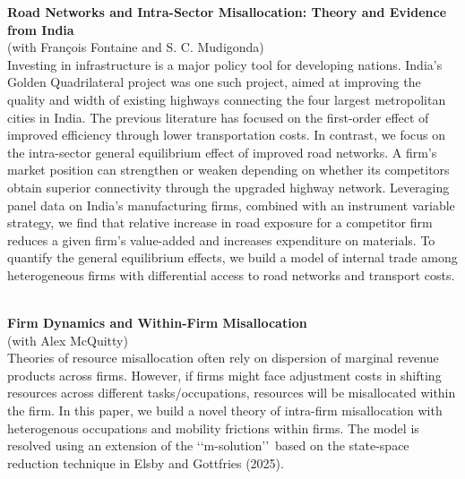 \documentclass[11pt,a4paper]{article}
\begin{document}
\textbf{Road Networks and Intra-Sector Misallocation: Theory and Evidence from India}
\vspace{0.1cm}\\
(with François Fontaine and S. C. Mudigonda)
\vspace{0.1cm}\\
Investing in infrastructure is a major policy tool for developing nations. India's Golden Quadrilateral project was one such project, aimed at improving the quality and width of existing highways connecting the four largest metropolitan cities in India. The previous literature has focused on the first-order effect of improved efficiency through lower transportation costs. In contrast, we focus on the intra-sector general equilibrium effect of improved road networks. A firm’s market position can strengthen or weaken depending on whether its competitors obtain superior connectivity through the upgraded highway network. Leveraging panel data on India's manufacturing firms, combined with an instrument variable strategy, we find that relative increase in road exposure for a competitor firm reduces a given firm's value-added and increases expenditure on materials. To quantify the general equilibrium effects, we build a model of internal trade among heterogeneous firms with differential access to road networks and transport costs.

\vspace{0.6em}\\

\textbf{Firm Dynamics and Within-Firm Misallocation}
\vspace{0.1cm}\\
(with Alex McQuitty)
\vspace{0.1cm}\\
Theories of resource misallocation often rely on dispersion of marginal revenue products across firms. However, if firms might face adjustment costs in shifting resources across different tasks/occupations, resources will be misallocated within the firm. In this paper, we build a novel theory of intra-firm misallocation with heterogenous occupations and mobility frictions within firms. The model is resolved using an extension of the \lq\lq m-solution\rq\rq\ based on the state-space reduction technique in Elsby and Gottfries (2025). 




\end{document}
